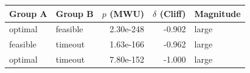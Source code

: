 \begin{tabular}{l l r r l}
\toprule
Group A & Group B & $p$ (MWU) & $\delta$ (Cliff) & Magnitude\\
\midrule
optimal & feasible & 2.30e-248 & -0.902 & large\\
feasible & timeout & 1.63e-166 & -0.962 & large\\
optimal & timeout & 7.80e-152 & -1.000 & large\\
\bottomrule
\end{tabular}
